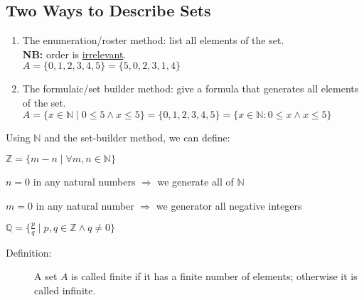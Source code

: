 \documentclass[10pt]{article}
\begin{document}
	\subsection{Two Ways to Describe Sets}
	\begin{enumerate}
		\item The enumeration/roster method: list all elements of the set.\\ \textbf{NB:} order is \underline{irrelevant}.\\ $A=\{0, 1, 2, 3, 4, 5\}=\{5, 0, 2, 3, 1, 4\}$
		\item The formulaic/set builder method: give a formula that generates all elements of the set.\\ $A=\{x \in \mathbb{N} \mid 0 \leq 5 \land x \leq 5\} = \{0, 1, 2, 3, 4, 5\} = \{x \in \mathbb{N} : 0 \leq x \land x \leq 5 \}$
	\end{enumerate}
	Using $\mathbb{N}$ and the set-builder method, we can define:
		
	$\mathbb{Z} = \{m-n \mid \forall m, n \in \mathbb{N} \}$
		
	\hspace{5mm} $n=0$ in any natural numbers $\Rightarrow$ we generate all of $\mathbb{N}$
		
	\hspace{5mm} $m=0$ in any natural number $\Rightarrow$ we generator all negative integers
		
	$\mathbb{Q} = \{\frac{p}{q} \mid p, q \in \mathbb{Z} \land q \neq 0 \}$
	\begin{description}
		\item[Definition:] A set $A$ is called finite if it has a finite number of elements; otherwise it is called infinite.
	\end{description}
		
\end{document}
